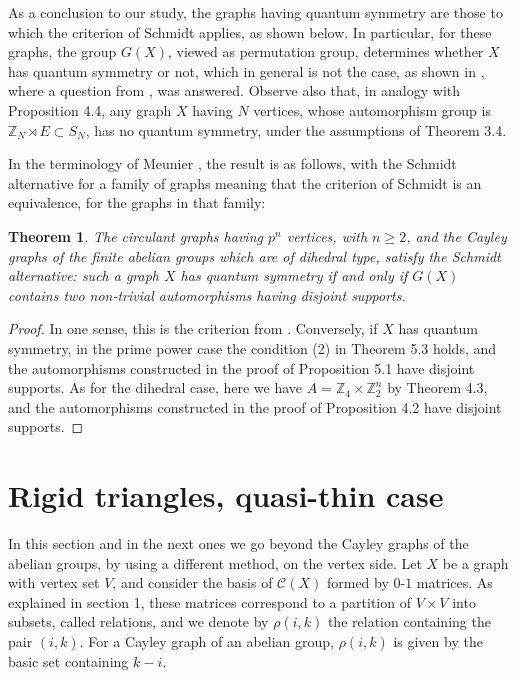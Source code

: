 \documentclass[11pt]{amsart}
\newtheorem{theorem}{Theorem}[section]
\newcommand{\C}{\mathcal C}
\newcommand{\Z}{\mathbb Z}
\begin{document}
As a conclusion to our study, the graphs having quantum symmetry are those to which the criterion of Schmidt \cite{sch} applies, as shown below. In particular, for these graphs, the group $G(X)$, viewed as permutation group, determines whether $X$ has quantum symmetry or not, which in general is not the case, as shown in \cite{drs}, where a question from \cite{bm}, \cite{sc2} was answered. Observe also that, in analogy with Proposition 4.4, any graph $X$ having $N$ vertices, whose automorphism group is $\Z_N\rtimes E\subset S_N$, has no quantum symmetry, under the assumptions of Theorem 3.4.

In the terminology of Meunier \cite{meu}, the result is as follows, with the Schmidt alternative for a family of graphs meaning that the criterion of Schmidt is an equivalence, for the graphs in that family:

\begin{theorem}
The circulant graphs having $p^n$ vertices, with $n\geq2$, and the Cayley graphs of the finite abelian groups which are of dihedral type, satisfy the Schmidt alternative: such a graph $X$ has quantum symmetry if and only if $G(X)$ contains two non-trivial automorphisms having disjoint supports.
\end{theorem}

\begin{proof}
In one sense, this is the criterion from \cite{sch}. Conversely, if $X$ has quantum symmetry, in the prime power case the condition (2) in Theorem 5.3 holds, and the automorphisms constructed in the proof of Proposition 5.1 have disjoint supports. As for the dihedral case, here we have $A=\Z_4\times\Z_2^n$ by Theorem 4.3, and the automorphisms constructed in the proof of Proposition 4.2 have disjoint supports.
\end{proof}

\section{Rigid triangles, quasi-thin case}

In this section and in the next ones we go beyond the Cayley graphs of the abelian groups, by using a different method, on the vertex side. Let $X$ be a graph with vertex set $V$, and consider the basis of $\C(X)$ formed by $0$-$1$ matrices. As explained in section 1, these matrices correspond to a partition of $V\times V$ into subsets, called relations, and we denote by $\rho(i,k)$ the relation containing the pair $(i,k)$. For a Cayley graph of an abelian group, $\rho(i,k)$ is given by the basic set containing $k-i$.
\end{document}
